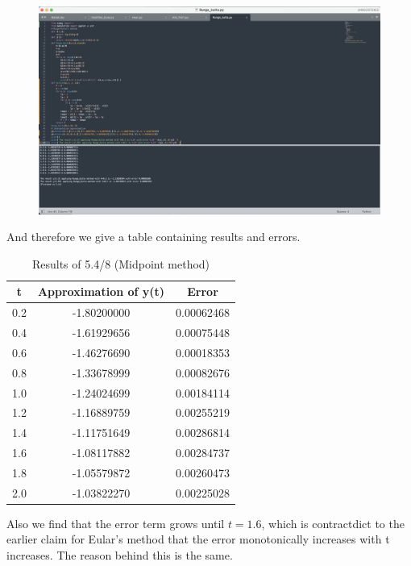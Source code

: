 \documentclass{article}
\begin{document}
    \begin{figure}[h]
    \centering
    \includegraphics[scale=0.22]{Program4}
    \end{figure}

    And therefore we give a table containing results and errors. 

    \begin{table}[htbp]
    \centering
    \caption{Results of 5.4/8 (Midpoint method)}
    \begin{tabular}{c|c|c}
    \toprule
    t& \textbf{Approximation of y(t)} & \textbf{Error} \\ 
    \midrule
    0.2 & -1.80200000 & 0.00062468\\
    0.4 & -1.61929656 & 0.00075448\\
    0.6 & -1.46276690 & 0.00018353\\
    0.8 & -1.33678999 & 0.00082676\\
    1.0 & -1.24024699 & 0.00184114\\
    1.2 & -1.16889759 & 0.00255219\\
    1.4 & -1.11751649 & 0.00286814\\
    1.6 & -1.08117882 & 0.00284737\\
    1.8 & -1.05579872 & 0.00260473\\
    2.0 & -1.03822270 & 0.00225028\\
    \bottomrule
    \end{tabular}
    \end{table}

    Also we find that the error term grows until $t=1.6$, which is contractdict to the earlier claim for Eular's method that the error monotonically increases with t increases. The reason behind this is the same.
\end{document}
